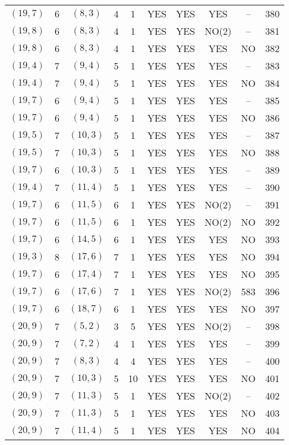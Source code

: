 \begin{longtable}{|c|c|c|c|c|c|c|c|c|c|}
$(19, 7)$ & 6 & $(8, 3)$ & 4 & 1 & YES & YES & YES & -- & 380\\
$(19, 8)$ & 6 & $(8, 3)$ & 4 & 1 & YES & YES & NO(2) & -- & 381\\
$(19, 8)$ & 6 & $(8, 3)$ & 4 & 1 & YES & YES & YES & NO & 382\\
$(19, 4)$ & 7 & $(9, 4)$ & 5 & 1 & YES & YES & YES & -- & 383\\
$(19, 4)$ & 7 & $(9, 4)$ & 5 & 1 & YES & YES & YES & NO & 384\\
$(19, 7)$ & 6 & $(9, 4)$ & 5 & 1 & YES & YES & YES & -- & 385\\
$(19, 7)$ & 6 & $(9, 4)$ & 5 & 1 & YES & YES & YES & NO & 386\\
$(19, 5)$ & 7 & $(10, 3)$ & 5 & 1 & YES & YES & YES & -- & 387\\
$(19, 5)$ & 7 & $(10, 3)$ & 5 & 1 & YES & YES & YES & NO & 388\\
$(19, 7)$ & 6 & $(10, 3)$ & 5 & 1 & YES & YES & YES & -- & 389\\
$(19, 4)$ & 7 & $(11, 4)$ & 5 & 1 & YES & YES & YES & -- & 390\\
$(19, 7)$ & 6 & $(11, 5)$ & 6 & 1 & YES & YES & NO(2) & -- & 391\\
$(19, 7)$ & 6 & $(11, 5)$ & 6 & 1 & YES & YES & NO(2) & NO & 392\\
$(19, 7)$ & 6 & $(14, 5)$ & 6 & 1 & YES & YES & YES & NO & 393\\
$(19, 3)$ & 8 & $(17, 6)$ & 7 & 1 & YES & YES & YES & NO & 394\\
$(19, 7)$ & 6 & $(17, 4)$ & 7 & 1 & YES & YES & YES & NO & 395\\
$(19, 7)$ & 6 & $(17, 6)$ & 7 & 1 & YES & YES & NO(2) & 583 & 396\\
$(19, 7)$ & 6 & $(18, 7)$ & 6 & 1 & YES & YES & YES & NO & 397\\
$(20, 9)$ & 7 & $(5, 2)$ & 3 & 5 & YES & YES & NO(2) & -- & 398\\
$(20, 9)$ & 7 & $(7, 2)$ & 4 & 1 & YES & YES & YES & -- & 399\\
$(20, 9)$ & 7 & $(8, 3)$ & 4 & 4 & YES & YES & YES & -- & 400\\
$(20, 9)$ & 7 & $(10, 3)$ & 5 & 10 & YES & YES & YES & NO & 401\\
$(20, 9)$ & 7 & $(11, 3)$ & 5 & 1 & YES & YES & NO(2) & -- & 402\\
$(20, 9)$ & 7 & $(11, 3)$ & 5 & 1 & YES & YES & YES & NO & 403\\
$(20, 9)$ & 7 & $(11, 4)$ & 5 & 1 & YES & YES & YES & NO & 404\\

\end{longtable}

